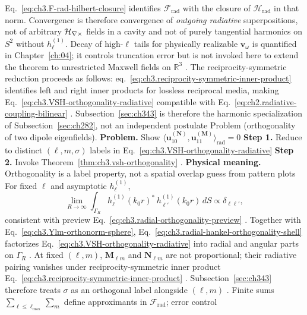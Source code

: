 Eq.~\eqref{eq:ch3.F-rad-hilbert-closure} identifies $\mathcal{F}_{\mathrm{rad}}$ with the closure of $\mathcal{H}_{\mathrm{rad}}$ in that norm.
Convergence is therefore convergence of \emph{outgoing radiative} superpositions, not of arbitrary $\mathcal{H}_{\nabla\times}$ fields in a cavity and not of purely tangential harmonics on $S^{2}$ without $h_{\ell}^{(1)}$.
Decay of high-$\ell$ tails for physically realizable $\mathbf{v}_\omega$ is quantified in Chapter~\ref{ch:04}; it controls truncation error but is not invoked here to extend the theorem to unrestricted Maxwell fields on $\mathbb{R}^{3}$ \cite{jackson1999,hansen1988}.
The reciprocity-symmetric reduction proceeds as follows: eq.~\eqref{eq:ch3.reciprocity-symmetric-inner-product} identifies left and right inner products for lossless
reciprocal media, making Eq.~\eqref{eq:ch3.VSH-orthogonality-radiative} compatible with
Eq.~\eqref{eq:ch2.radiative-coupling-bilinear} . Subsection~\ref{sec:ch343} is
therefore the harmonic specialization of Subsection~\ref{sec:ch282}, not an independent postulate
Problem (orthogonality of two dipole eigenfields). \textbf{Problem.} Show \(\langle \mathbf{u}_{10}^{(\mathbf{N})},\mathbf{u}_{11}^{(\mathbf{M})}\rangle_{\mathrm{rad}}=0\)
\textbf{Step 1.} Reduce to distinct \((\ell,m,\sigma)\) labels in Eq.~\eqref{eq:ch3.VSH-orthogonality-radiative}
\textbf{Step 2.} Invoke Theorem~\ref{thm:ch3.vsh-orthogonality} .
\textbf{Physical meaning.} Orthogonality is a label property, not a spatial overlap guess from pattern plots
For fixed \(\ell\) and asymptotic \(h_{\ell}^{(1)}\),
\begin{equation}
\label{eq:ch3.radial-hankel-orthogonality-shell}
\lim_{R\to\infty}
\int_{\Gamma_R}
h_{\ell}^{(1)}(k_{0}r)^{*}\,
h_{\ell'}^{(1)}(k_{0}r)\,dS
\propto
\delta_{\ell\ell'},
\end{equation}
consistent with preview Eq.~\eqref{eq:ch3.radial-orthogonality-preview} . Together with
Eq.~\eqref{eq:ch3.Ylm-orthonorm-sphere}, Eq.~\eqref{eq:ch3.radial-hankel-orthogonality-shell} factorizes
Eq.~\eqref{eq:ch3.VSH-orthogonality-radiative} into radial and angular parts on \(\Gamma_R\) .
At fixed \((\ell,m)\), \(\mathbf{M}_{\ell m}\) and \(\mathbf{N}_{\ell m}\) are not proportional; their radiative
pairing vanishes under reciprocity-symmetric inner product Eq.~\eqref{eq:ch3.reciprocity-symmetric-inner-product}
. Subsection~\ref{sec:ch343} therefore treats \(\sigma\) as an orthogonal label
alongside \((\ell,m)\) .
Finite sums \(\sum_{\ell\le\ell_{\max}}\sum_m\) define approximants in \(\mathcal{F}_{\mathrm{rad}}\); error control
